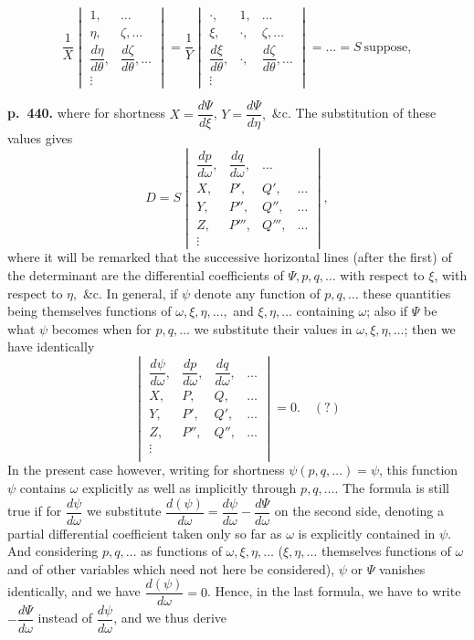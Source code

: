 \documentclass[11pt]{article}
\begin{document}
\[ \frac{1}{X}\begin{vmatrix} 1,&\ldots\\ \eta,&\zeta,\ldots\\[2pt] \dfrac{d\eta}{d\theta},&\dfrac{d\zeta}{d\theta},\ldots\\ \vdots& \end{vmatrix} = \frac{1}{Y}\begin{vmatrix} \cdot,&1,&\ldots\\ \xi,&\cdot,&\zeta,\ldots\\[2pt] \dfrac{d\xi}{d\theta},&\cdot,&\dfrac{d\zeta}{d\theta},\ldots\\ \vdots&& \end{vmatrix} = \ldots = S\ \text{suppose}, \]

\noindent\textbf{p.~440.} where for shortness $X = \dfrac{d\Psi}{d\xi}$, $Y = \dfrac{d\Psi}{d\eta},$ \&c. The substitution of these values gives
\[ D = S\begin{vmatrix} \dfrac{dp}{d\omega},&\dfrac{dq}{d\omega},&\ldots\\[6pt] X,&P',&Q',&\ldots\\[2pt] Y,&P'',&Q'',&\ldots\\[2pt] Z,&P''',&Q''',&\ldots\\ \vdots&&& \end{vmatrix}, \]
where it will be remarked that the successive horizontal lines (after the first) of the determinant are the differential coefficients of $\Psi, p, q, \ldots$ with respect to $\xi$, with respect to $\eta,$ \&c. In general, if $\psi$ denote any function of $p, q, \ldots$ these quantities being themselves functions of $\omega, \xi, \eta, \ldots,$ and $\xi, \eta, \ldots$ containing $\omega$; also if $\Psi$ be what $\psi$ becomes when for $p, q, \ldots$ we substitute their values in $\omega, \xi, \eta, \ldots$; then we have identically
\[ \begin{vmatrix} \dfrac{d\psi}{d\omega},&\dfrac{dp}{d\omega},&\dfrac{dq}{d\omega},&\ldots\\[6pt] X,&P,&Q,&\ldots\\[2pt] Y,&P',&Q',&\ldots\\[2pt] Z,&P'',&Q'',&\ldots\\ \vdots&&&\\ \end{vmatrix} = 0.\quad(?) \]
In the present case however, writing for shortness $\psi(p, q, \ldots) = \psi$, this function $\psi$ contains $\omega$ explicitly as well as implicitly through $p, q, \ldots$. The formula is still true if for $\dfrac{d\psi}{d\omega}$ we substitute $\dfrac{d(\psi)}{d\omega} = \dfrac{d\psi}{d\omega} - \dfrac{d\Psi}{d\omega}$ on the second side, denoting a partial differential coefficient taken only so far as $\omega$ is explicitly contained in $\psi$. And considering $p, q, \ldots$ as functions of $\omega, \xi, \eta, \ldots$ ($\xi, \eta, \ldots$ themselves functions of $\omega$ and of other variables which need not here be considered), $\psi$ or $\Psi$ vanishes identically, and we have $\dfrac{d(\psi)}{d\omega} = 0$. Hence, in the last formula, we have to write $-\dfrac{d\Psi}{d\omega}$ instead of $\dfrac{d\psi}{d\omega}$, and we thus derive
\end{document}
